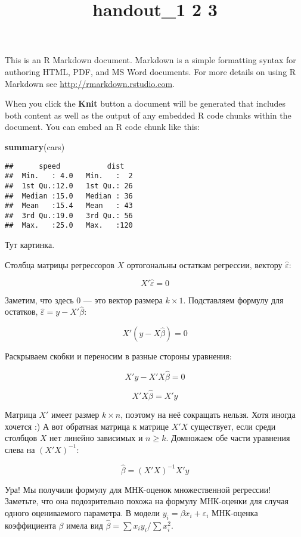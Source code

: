 \documentclass[]{article}
\title{handout\_1 2 3}
\author{}
\date{}
\newenvironment{Shaded}{\begin{snugshade}}{\end{snugshade}}
\newcommand{\KeywordTok}[1]{\textcolor[rgb]{0.13,0.29,0.53}{\textbf{{#1}}}}
\newcommand{\NormalTok}[1]{{#1}}
\begin{document}
\maketitle


{
\hypersetup{linkcolor=black}
\setcounter{tocdepth}{2}
\tableofcontents
}
This is an R Markdown document. Markdown is a simple formatting syntax
for authoring HTML, PDF, and MS Word documents. For more details on
using R Markdown see \url{http://rmarkdown.rstudio.com}.

When you click the \textbf{Knit} button a document will be generated
that includes both content as well as the output of any embedded R code
chunks within the document. You can embed an R code chunk like this:

\begin{Shaded}
\begin{Highlighting}[]
\KeywordTok{summary}\NormalTok{(cars)}
\end{Highlighting}
\end{Shaded}

\begin{verbatim}
##      speed           dist    
##  Min.   : 4.0   Min.   :  2  
##  1st Qu.:12.0   1st Qu.: 26  
##  Median :15.0   Median : 36  
##  Mean   :15.4   Mean   : 43  
##  3rd Qu.:19.0   3rd Qu.: 56  
##  Max.   :25.0   Max.   :120
\end{verbatim}

Тут картинка.

Столбца матрицы регрессоров $X$ ортогональны остаткам регрессии, вектору
$\hat{\varepsilon}$:

\[
X'\hat{\varepsilon}=0
\]

Заметим, что здесь 0 --- это вектор размера $k\times 1$. Подставляем
формулу для остатков, $\hat{\varepsilon}=y-X'\hat{\beta}$:

\[
X'(y-X\hat{\beta})=0
\]

Раскрываем скобки и переносим в разные стороны уравнения:

\[
X'y-X'X\hat{\beta}=0
\]

\[
X'X\hat{\beta}=X'y
\]

Матрица $X'$ имеет размер $k\times n$, поэтому на неё сокращать нельзя.
Хотя иногда хочется :) А вот обратная матрица к матрице $X'X$
существует, если среди столбцов $X$ нет линейно зависимых и $n\geq k$.
Домножаем обе части уравнения слева на $(X'X)^{-1}$:

\[
\hat{\beta}=(X'X)^{-1}X'y
\]

Ура! Мы получили формулу для МНК-оценок множественной регрессии!
Заметьте, что она подозрительно похожа на формулу МНК-оценки для случая
одного оцениваемого параметра. В модели $y_i=\beta x_i +\varepsilon_i$
МНК-оценка коэффициента $\beta$ имела вид
$\hat{\beta}=\sum x_i y_i /\sum x_i^2$.
\end{document}

